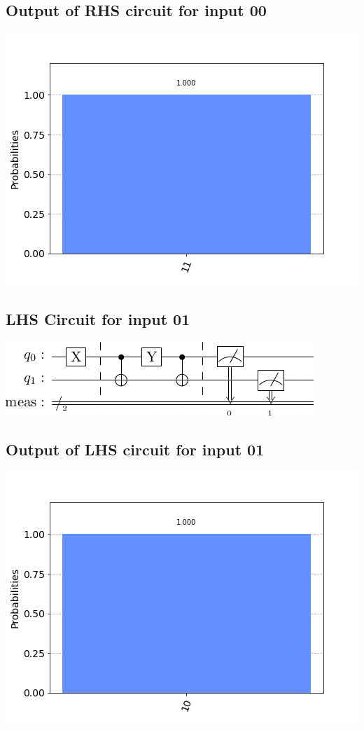 \documentclass[a4paper]{article}
\begin{document}
\begin{answer}[Question 1 b (d)]
        \subsection*{Output of RHS circuit for input 00}
        \includegraphics[scale = 0.5]{d200-out.png}
        \subsection*{LHS Circuit for input 01}
        \includegraphics[scale=0.5]{d101.png}
        \subsection*{Output of LHS circuit for input 01}
        \includegraphics[scale = 0.5]{d101-out.png}

\end{answer}
\end{document}
